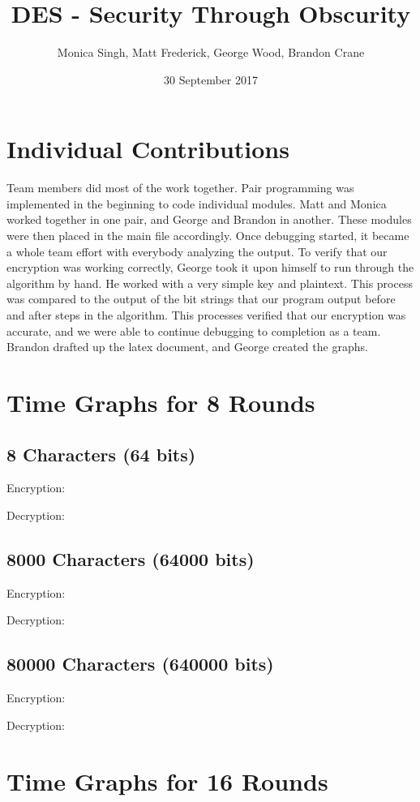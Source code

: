 \documentclass[11pt]{article}
\title{DES - Security Through Obscurity}
\author{Monica Singh, Matt Frederick, George Wood, Brandon Crane}
\date{30 September 2017}
\begin{document}
\maketitle

\thispagestyle{empty}

\section{Individual Contributions}
Team members did most of the work together. Pair programming was implemented
in the beginning to code individual modules. Matt and Monica worked together in
one pair, and George and Brandon in another. These modules were then placed in
the main file accordingly. Once debugging started, it became
a whole team effort with everybody analyzing the output. To verify that our
encryption was working correctly,
George took it upon himself to run through the algorithm by hand. He worked with
a very simple key and plaintext. This process was compared to the output of the
bit strings that our program output before and after steps in the algorithm.
This processes verified that our encryption was accurate, and we were able to
continue debugging to completion as a team. Brandon drafted up the latex
document, and George created the graphs.


\section{Time Graphs for 8 Rounds}

\setcounter{secnumdepth}{0}
\subsection{8 Characters (64 bits)}
Encryption:

Decryption:

\subsection{8000 Characters (64000 bits)}
Encryption:

Decryption:

\subsection{80000 Characters (640000 bits)}
Encryption:

Decryption:
\setcounter{secnumdepth}{1}

\section{Time Graphs for 16 Rounds}
\end{document}
